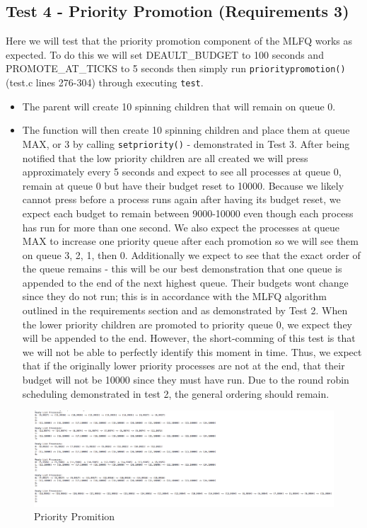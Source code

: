 \documentclass[11pt,letterpaper]{report}
\begin{document}
\subsection*{Test 4 - Priority Promotion (Requirements 3) }
Here we will test that the priority promotion component of the MLFQ works as expected. To do this we will set DEAULT\_BUDGET to 100 seconds and PROMOTE\_AT\_TICKS to 5 seconds then simply run {\tt prioritypromotion()} (test.c lines 276-304) through executing {\tt test}. 
\begin{itemize}
	\item The parent will create 10 spinning children that will remain on queue 0.
	
	\item The function will then create 10
		spinning children and 
		place them at queue MAX, or 3 by calling {\tt setpriority()} - demonstrated in Test 3. After being notified that the low priority children are all created we will press  approximately every 5 seconds and expect to see all processes at queue 0, remain at queue 0 but have their budget reset to 10000. Because we likely cannot press  before a process runs
		again after having its budget reset, we expect each budget to remain between 9000-10000 even though each process has run for more than one 
		second.  
		We also expect the processes at queue MAX to increase one priority queue after each promotion so we will see them on queue 3, 2, 1, then 0.
		Additionally we expect to see that the exact order of the queue remains - this will be our best demonstration that one queue is appended to the end of the next highest queue. Their budgets wont change since they do not run; this is in accordance with the
		MLFQ algorithm outlined in the requirements section and as demonstrated by Test 2. When the lower priority children are promoted to priority queue 0, we expect they will be appended to the end. 
		However, the short-comming of this test is that we will not be able to perfectly identify this moment in time. Thus, we expect that if the originally lower
		priority processes are not at the end, that their budget will not be 10000 since they must have run. Due to the round robin scheduling demonstrated 
		in test 2, the general ordering should remain.
\end{itemize}

\begin{figure}[h]
\centering
\includegraphics[width=1\linewidth]{promotion.png}
\caption{Priority Promition}
\label{fig:5}
\end{figure}
\end{document}
